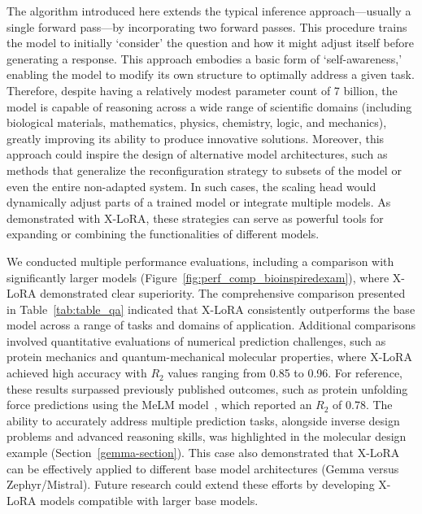 The algorithm introduced here extends the typical inference approach—usually a single forward pass—by incorporating two forward passes. This procedure trains the model to initially ‘consider’ the question and how it might adjust itself before generating a response. This approach embodies a basic form of ‘self-awareness,’ enabling the model to modify its own structure to optimally address a given task. Therefore, despite having a relatively modest parameter count of 7 billion, the model is capable of reasoning across a wide range of scientific domains (including biological materials, mathematics, physics, chemistry, logic, and mechanics), greatly improving its ability to produce innovative solutions. Moreover, this approach could inspire the design of alternative model architectures, such as methods that generalize the reconfiguration strategy to subsets of the model or even the entire non-adapted system. In such cases, the scaling head would dynamically adjust parts of a trained model or integrate multiple models. As demonstrated with X-LoRA, these strategies can serve as powerful tools for expanding or combining the functionalities of different models.

We conducted multiple performance evaluations, including a comparison with significantly larger models (Figure~\ref{fig:perf_comp_bioinspiredexam}), where X-LoRA demonstrated clear superiority. The comprehensive comparison presented in Table~\ref{tab:table_qa} indicated that X-LoRA consistently outperforms the base model across a range of tasks and domains of application. Additional comparisons involved quantitative evaluations of numerical prediction challenges, such as protein mechanics and quantum-mechanical molecular properties, where X-LoRA achieved high accuracy with $R_2$ values ranging from 0.85 to 0.96. For reference, these results surpassed previously published outcomes, such as protein unfolding force predictions using the MeLM model~\cite{Buehler2023MeLMProblemsb}, which reported an $R_2$ of 0.78. The ability to accurately address multiple prediction tasks, alongside inverse design problems and advanced reasoning skills, was highlighted in the molecular design example (Section~\ref{gemma-section}). This case also demonstrated that X-LoRA can be effectively applied to different base model architectures (Gemma versus Zephyr/Mistral). Future research could extend these efforts by developing X-LoRA models compatible with larger base models.


